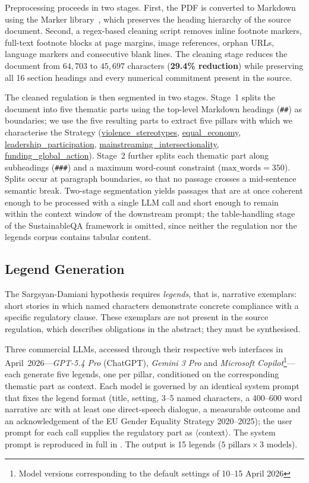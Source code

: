 \documentclass[pdflatex, sn-apa]{sn-jnl}%
\theoremstyle{thmstyleone}%
\theoremstyle{thmstyletwo}%
\theoremstyle{thmstylethree}%
\begin{document}
Preprocessing proceeds in two stages. First, the PDF is converted to Markdown
using the Marker library~\citep{paruchuri2024marker}, which preserves the heading
hierarchy of the source document. Second, a regex-based cleaning script removes
inline footnote markers, full-text footnote blocks at page margins, image
references, orphan URLs, language markers and consecutive blank lines.
The cleaning stage reduces the document from $64{,}703$ to $45{,}697$ characters
(\textbf{29.4\% reduction}) while preserving all 16 section headings and every
numerical commitment present in the source.

The cleaned regulation is then segmented in two stages. Stage~1 splits the
document into five thematic parts using the top-level Markdown headings
({\small\texttt{\#\#}}) as boundaries; we use the five resulting parts to extract
five pillars with which we characterise the Strategy (\url{violence_stereotypes},
\url{equal_economy}, \url{leadership_participation},
\url{mainstreaming_intersectionality}, \url{funding_global_action}). Stage~2
further splits each thematic part along subheadings ({\small\texttt{\#\#\#}}) and
a maximum word-count constraint ($\text{max\_words} = 350$). Splits occur at
paragraph boundaries, so that no passage crosses a mid-sentence semantic break.
Two-stage segmentation yields passages that are at once coherent enough to be
processed with a single LLM call and short enough to remain within the context
window of the downstream prompt; the table-handling stage of the SustainableQA
framework is omitted, since neither the regulation nor the legends corpus
contains tabular content.

\subsection{Legend Generation}
\label{sec:method:legends}


The Sargsyan-Damiani hypothesis requires \emph{legends}, that is, narrative
exemplars: short stories in which named characters demonstrate concrete
compliance with a specific regulatory clause. These exemplars are not present in
the source regulation, which describes obligations in the abstract; they must be
synthesised.

Three commercial LLMs, accessed through their respective web interfaces in
April~2026---\textit{GPT-5.4 Pro} (ChatGPT), \textit{Gemini 3 Pro} and
\textit{Microsoft Copilot}\footnote{Model versions corresponding to the default
settings of 10--15 April 2026}---each generate five legends, one per pillar,
conditioned on the corresponding thematic part as context. Each model is governed
by an identical system prompt that fixes the legend format (title, setting, 3--5
named characters, a 400--600 word narrative arc with at least one direct-speech
dialogue, a measurable outcome and an acknowledgement of the EU Gender Equality
Strategy 2020--2025); the user prompt for each call supplies the regulatory part
as $\langle$context$\rangle$. The system prompt is reproduced in full in
. The output is 15 legends ($5 \text{ pillars}
\times 3 \text{ models}$).
\end{document}
